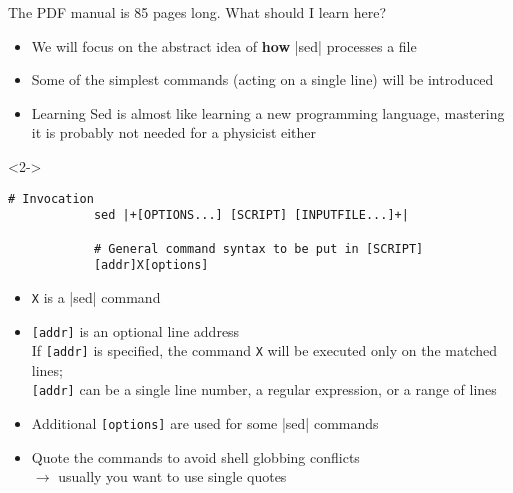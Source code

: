 \begin{frame}[fragile]{The PDF manual is 85 pages long. What should I learn here?}
    \vspace{-4mm}
    \begin{itemize}
        \item We will focus on the abstract idea of \textbf{how} \bash|sed| processes a file
        \item Some of the simplest commands (acting on a single line) will be introduced
        \item Learning Sed is almost like learning a new programming language, mastering it is probably not needed for a physicist either
    \end{itemize}
    \begin{uncoverenv}<2->
        \begin{lstlisting}[style=MyBash, numbers=none, aboveskip=2mm, belowskip=-5mm]
            # Invocation
            sed |+[OPTIONS...] [SCRIPT] [INPUTFILE...]+|

            # General command syntax to be put in [SCRIPT]
            [addr]X[options]
        \end{lstlisting}
    \end{uncoverenv}
    \begin{itemize}[<3>]
        \item \texttt{X} is a \bash|sed| command
        \item \texttt{[addr]} is an optional line address\\
              If \texttt{[addr]} is specified, the command \texttt{X} will be executed only on the matched lines;\\
              \texttt{[addr]} can be a single line number, a regular expression, or a range of lines
        \item Additional \texttt{[options]} are used for some \bash|sed| commands
        \item Quote the commands to avoid shell globbing conflicts\\
              $\to$ usually you want to use single quotes
    \end{itemize}
\end{frame}
